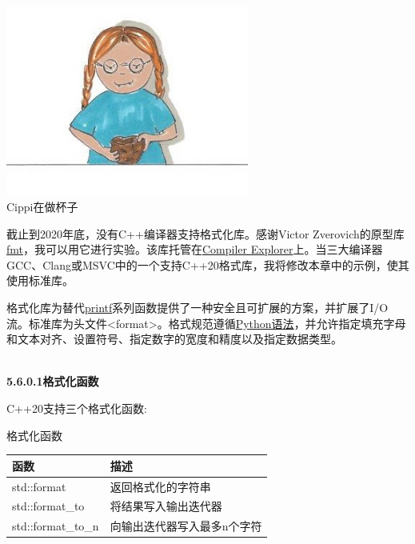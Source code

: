 \begin{center}
\includegraphics[width=0.6\textwidth]{content/3/chapter5/images/29.png}\\
Cippi在做杯子
\end{center}

\begin{tcolorbox}[breakable,enhanced jigsaw,colback=blue!5!white,colframe=blue!75!black,title={缺少编译器支持}]
	
截止到2020年底，没有C++编译器支持格式化库。感谢Victor Zverovich的原型库\href{https://github.com/fmtlib/fmt}{fmt}，我可以用它进行实验。该库托管在\href{https://godbolt.org/z/Eq5763}{Compiler Explorer}上。当三大编译器GCC、Clang或MSVC中的一个支持C++20格式库，我将修改本章中的示例，使其使用标准库。
	
\end{tcolorbox}

格式化库为替代\href{https://en.cppreference.com/w/cpp/io/c/fprintf}{printf}系列函数提供了一种安全且可扩展的方案，并扩展了I/O流。标准库为头文件<format>。格式规范遵循\href{https://docs.python.org/3/library/stdtypes.html#str.format}{Python语法}，并允许指定填充字母和文本对齐、设置符号、指定数字的宽度和精度以及指定数据类型。

\hspace*{\fill} \\ %
\noindent
\textbf{5.6.0.1\hspace{0.2cm}格式化函数}

C++20支持三个格式化函数:

\begin{center}
格式化函数
\end{center}

\begin{table}[H]
\centering
\begin{tabular}{ll}
\textbf{函数}  & \textbf{描述}                               \\ \hline
std::format        & 返回格式化的字符串                      \\
std::format\_to    & 将结果写入输出迭代器           \\
std::format\_to\_n & 向输出迭代器写入最多n个字符
\end{tabular}
\end{table}

